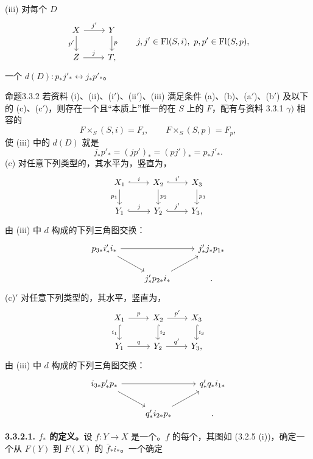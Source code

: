 (iii) 对每个 $D$
\[\begin{tikzcd}X\arrow[r,"j'"]\arrow[d,"p'"']&Y\arrow[d,"p"]\\Z\arrow[r,"j"]&T,\end{tikzcd}\qquad j,j'\in\operatorname{Fl}(S,i),\ p,p'\in\operatorname{Fl}(S,p),\]
一个 $d(D):p_*j'_*\leftrightarrow j_*p'_*$。
\begin{SGAresult}{命题}{3.3.2}
若资料 (i)、(ii)、(i$'$)、(ii$'$)、(iii) 满足条件 (a)、(b)、(a$'$)、(b$'$) 及以下的 (c)、(c$'$)，则存在一个且“本质上”惟一的在 $S$ 上的 $F$，配有与资料 3.3.1 $\gamma)$ 相容的
\[F\times_S(S,i)=F_i,\qquad F\times_S(S,p)=F_p,\]
使 (iii) 中的 $d(D)$ 就是
\[j_*p'_*= (jp')_*=(pj')_*=p_*j'_* .\]
(c) 对任意下列类型的，其水平为，竖直为，
\[\begin{tikzcd}X_1\arrow[r,hook,"i"]\arrow[d,"p_1"']&X_2\arrow[r,hook,"i'"]\arrow[d,"p_2"]&X_3\arrow[d,"p_3"]\\Y_1\arrow[r,hook,"j"]&Y_2\arrow[r,hook,"j'"]&Y_3,\end{tikzcd}\]
由 (iii) 中 $d$ 构成的下列三角图交换：
\[\begin{tikzcd}p_{3*}i'_*i_*\arrow[rr]\arrow[dr]&&j'_*j_*p_{1*}\\&j'_*p_{2*}i_*\arrow[ur]&.\end{tikzcd}\]
(c)$'$ 对任意下列类型的，其水平，竖直为，
\[\begin{tikzcd}X_1\arrow[r,"p"]\arrow[d,hook,"i_1"']&X_2\arrow[r,"p'"]\arrow[d,hook,"i_2"]&X_3\arrow[d,hook,"i_3"]\\Y_1\arrow[r,"q"]&Y_2\arrow[r,"q'"]&Y_3,\end{tikzcd}\]
由 (iii) 中 $d$ 构成的下列三角图交换：
\[\begin{tikzcd}i_{3*}p'_*p_*\arrow[rr]\arrow[dr]&&q'_*q_*i_{1*}\\&q'_*i_{2*}p_*\arrow[ur]&.\end{tikzcd}\]
\end{SGAresult}
\textbf{3.3.2.1. $f_*$ 的定义。}设 $f:Y\to X$ 是一个。$f$ 的每个，其图如 (3.2.5 (i))，确定一个从 $F(Y)$ 到 $F(X)$ 的 $\bar f_*i_*$。一个确定
